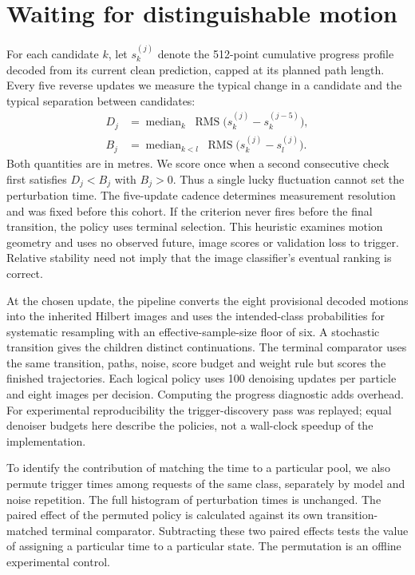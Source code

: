 \section{Waiting for distinguishable motion}
For each candidate $k$, let $s_k^{(j)}$ denote the 512-point cumulative progress profile decoded from its current clean prediction, capped at its planned path length. Every five reverse updates we measure the typical change in a candidate and the typical separation between candidates:
\begin{align}
 D_j &= \operatorname{median}_{k}\;
       \operatorname{RMS}\big(s_k^{(j)}-s_k^{(j-5)}\big),\\
 B_j &= \operatorname{median}_{k<l}\;
       \operatorname{RMS}\big(s_k^{(j)}-s_l^{(j)}\big).
\end{align}
Both quantities are in metres. We score once when a second consecutive check first satisfies $D_j<B_j$ with $B_j>0$. Thus a single lucky fluctuation cannot set the perturbation time. The five-update cadence determines measurement resolution and was fixed before this cohort. If the criterion never fires before the final transition, the policy uses terminal selection. This heuristic examines motion geometry and uses no observed future, image scores or validation loss to trigger. Relative stability need not imply that the image classifier's eventual ranking is correct.

At the chosen update, the pipeline converts the eight provisional decoded motions into the inherited Hilbert images and uses the intended-class probabilities for systematic resampling with an effective-sample-size floor of six. A stochastic transition gives the children distinct continuations. The terminal comparator uses the same transition, paths, noise, score budget and weight rule but scores the finished trajectories. Each logical policy uses 100 denoising updates per particle and eight images per decision. Computing the progress diagnostic adds overhead. For experimental reproducibility the trigger-discovery pass was replayed; equal denoiser budgets here describe the policies, not a wall-clock speedup of the implementation.

To identify the contribution of matching the time to a particular pool, we also permute trigger times among requests of the same class, separately by model and noise repetition. The full histogram of perturbation times is unchanged. The paired effect of the permuted policy is calculated against its own transition-matched terminal comparator. Subtracting these two paired effects tests the value of assigning a particular time to a particular state. The permutation is an offline experimental control.

